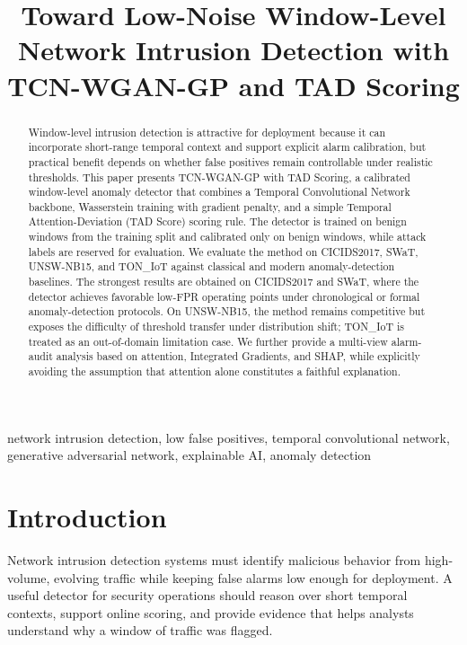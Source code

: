 \documentclass[conference]{IEEEtran}
\newcommand{\model}{TCN-WGAN-GP with TAD Scoring}
\newcommand{\tad}{TAD Score}
\begin{document}
\title{Toward Low-Noise Window-Level Network Intrusion Detection with TCN-WGAN-GP and TAD Scoring}

\author{
}

\maketitle

\begin{abstract}
Window-level intrusion detection is attractive for deployment because it can incorporate short-range temporal context and support explicit alarm calibration, but practical benefit depends on whether false positives remain controllable under realistic thresholds. This paper presents \model{}, a calibrated window-level anomaly detector that combines a Temporal Convolutional Network backbone, Wasserstein training with gradient penalty, and a simple Temporal Attention-Deviation (\tad{}) scoring rule. The detector is trained on benign windows from the training split and calibrated only on benign windows, while attack labels are reserved for evaluation. We evaluate the method on CICIDS2017, SWaT, UNSW-NB15, and TON\_IoT against classical and modern anomaly-detection baselines. The strongest results are obtained on CICIDS2017 and SWaT, where the detector achieves favorable low-FPR operating points under chronological or formal anomaly-detection protocols. On UNSW-NB15, the method remains competitive but exposes the difficulty of threshold transfer under distribution shift; TON\_IoT is treated as an out-of-domain limitation case. We further provide a multi-view alarm-audit analysis based on attention, Integrated Gradients, and SHAP, while explicitly avoiding the assumption that attention alone constitutes a faithful explanation.
\end{abstract}

\begin{IEEEkeywords}
network intrusion detection, low false positives, temporal convolutional network, generative adversarial network, explainable AI, anomaly detection
\end{IEEEkeywords}

\section{Introduction}
Network intrusion detection systems must identify malicious behavior from high-volume, evolving traffic while keeping false alarms low enough for deployment. A useful detector for security operations should reason over short temporal contexts, support online scoring, and provide evidence that helps analysts understand why a window of traffic was flagged.
\end{document}
